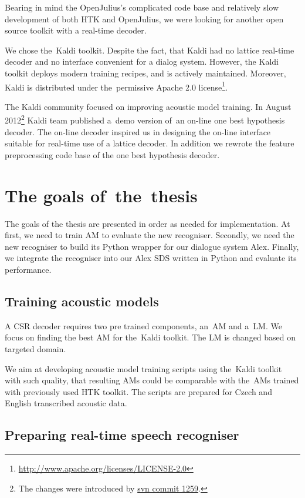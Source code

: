 Bearing in mind the OpenJulius's complicated code base and relatively slow development of both \ac{HTK} and OpenJulius, we were looking for another open source toolkit with a real-time decoder.

We chose the~Kaldi toolkit. 
Despite the fact,  that Kaldi had no lattice real-time decoder and no interface convenient for a dialog system.
However, the Kaldi toolkit deploys modern training recipes, and is actively maintained. 
Moreover, Kaldi is distributed under the~permissive Apache 2.0 license\footnote{\url{http://www.apache.org/licenses/LICENSE-2.0}}.

The Kaldi community focused on improving acoustic model training. 
In August 2012\footnote{The changes were introduced by \href{https://sourceforge.net/p/kaldi/code/1259/}{svn commit 1259}.} Kaldi team published a~demo version of~an on-line one best hypothesis decoder.
The on-line decoder inspired us in designing the on-line interface suitable for real-time use of a lattice decoder.
In addition we rewrote the feature preprocessing code base of the one best hypothesis decoder.

\section{The goals of~the~thesis} 
\label{sec:goals}
The goals of the thesis are presented in order as needed for implementation.
At first, we need to train \ac{AM} to evaluate the new recogniser.
Secondly, we need the new recogniser to build its Python wrapper for our dialogue system Alex.
Finally, we integrate the recogniser into our Alex \ac{SDS} written in Python and evaluate its performance.

\subsection{Training acoustic models} 
\label{sub:training_kaldi_acoustic_models}
A \acl{CSR} decoder requires two pre trained components, an~\acl{AM} and a~\acl{LM}. 
We focus on finding the best \acl{AM} for the~Kaldi toolkit. 
The \acl{LM} is changed based on targeted domain.

We aim at developing acoustic model training scripts using the~Kaldi toolkit with such quality, that resulting \acp{AM} could be comparable with the~\acp{AM} trained with previously used \ac{HTK} toolkit. 
The scripts are prepared for Czech and English transcribed acoustic data.


\subsection{Preparing real-time speech recogniser} 
\label{sub:compare_rt}

